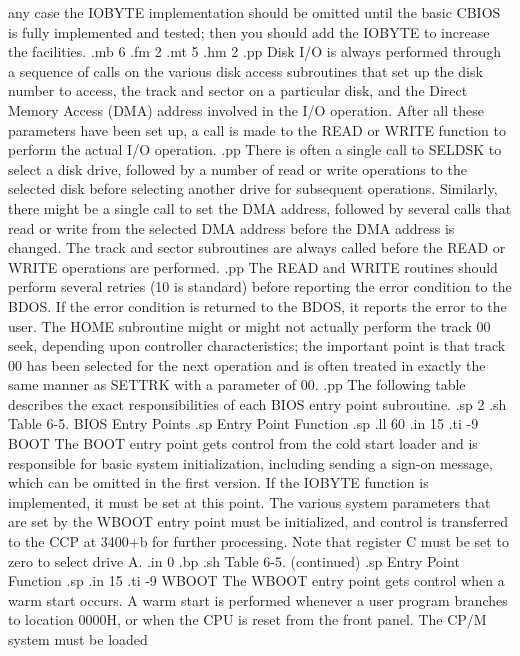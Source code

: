 any case the IOBYTE implementation should be omitted until the 
basic CBIOS is fully implemented and tested; then you should 
add the IOBYTE to increase the facilities.
.mb 6
.fm 2
.mt 5
.hm 2
.pp
Disk I/O is always performed through a sequence of calls on the 
various disk access subroutines that set up the disk number to 
access, the track and sector on a particular disk, and the Direct 
Memory Access (DMA) address involved in the I/O operation.  After 
all these parameters have been set up, a call is made to the READ 
or WRITE function to perform the actual I/O operation.
.pp
There is often a single call to SELDSK to select a disk drive, 
followed by a number of read or write operations to the selected 
disk before selecting another drive for subsequent operations.  
Similarly, there might be a single call to set the DMA address, 
followed by several calls that read or write from the selected 
DMA address before the DMA address is changed.  The track and 
sector subroutines are always called before the READ or WRITE 
operations are performed.
.pp
The READ and WRITE routines should perform several retries (10 is 
standard) before reporting the error condition to the BDOS.  If 
the error condition is returned to the BDOS, it reports the 
error to the user.  The HOME subroutine might or might not actually 
perform the track 00 seek, depending upon controller 
characteristics; the important point is that track 00 has been 
selected for the next operation and is often treated in exactly 
the same manner as SETTRK with a parameter of 00.
.pp
The following table describes the exact responsibilities of each 
BIOS entry point subroutine.
.sp 2
.sh
                  Table 6-5.  BIOS Entry Points
.sp
   Entry Point                    Function
.sp
.ll 60
.in 15
.ti -9
BOOT     The BOOT entry point gets control from the cold start loader and is
responsible for basic system initialization, including sending a sign-on
message, which can be omitted in the first version.  If the IOBYTE function
is implemented, it must be set at this point.  The various system parameters
that are set by the WBOOT entry point must be initialized, and control is
transferred to the CCP at 3400+b for further processing.  Note that register
C must be set to zero to select drive A.
.in 0
.bp
.sh
                     Table 6-5.  (continued)
.sp
   Entry Point                    Function
.sp
.in 15
.ti -9
WBOOT    The WBOOT entry point gets control when a warm start occurs.  A warm
start is performed whenever a user program branches to location 0000H, or
when the CPU is reset from the front panel.  The CP/M system must be loaded
